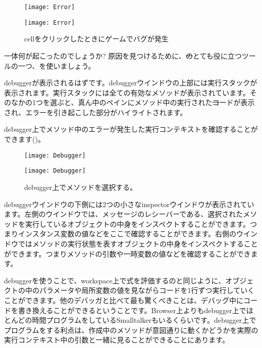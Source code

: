 \documentclass[a4paper,10pt,twoside]{book}
\begin{document}
\begin{figure}[ht]
\ifluluelse
	{\centerline{\texttt{[image: Error]}}}
	{\centerline{\texttt{[image: Error]}}}
\caption{cellをクリックしたときにゲームでバグが発生
}
\end{figure}

\noindent
一体何が起こったのでしょうか? 原因を見つけるために、\st のとても役に立つツールの一つ、を使いましょう。


debuggerが表示されるはずです。debuggerウインドウの上部には実行スタックが表示されます。実行スタックには全ての有効なメソッドが表示されています。そのなかの1つを選ぶと、真ん中のペインにメソッド中の実行された\st コードが表示され、エラーを引き起こした部分がハイライトされます。


debugger上でメソッド中のエラーが発生した実行コンテキストを確認することができます()。

\begin{figure}[ht]
\ifluluelse
	{\centerline {\texttt{[image: Debugger]}}}
	{\centerline {\texttt{[image: Debugger]}}}
\caption{debugger上でメソッドを選択する。
}
\end{figure}

debuggerウインドウの下側には2つの小さなinspectorウインドウが表示されています。左側のウインドウでは、メッセージのレシーバーである、選択されたメソッドを実行しているオブジェクトの中身をインスペクトすることができます。つまりインスタンス変数の値などをここで確認することができます。右側のウインドウではメソッドの実行状態を表すオブジェクトの中身をインスペクトすることができます。つまりメソッドの引数や一時変数の値などを確認することができます。

debuggerを使うことで、workspace上で式を評価するのと同じように、オブジェクトの中のパラメータや局所変数の値を見ながらコードを1行ずつ実行していくことができます。他のデバッガと比べて最も驚くべきことは、デバッグ中にコードを書き換えることができるということです。Browser上よりもdebugger上でほとんどの時間プログラムをしているSmalltalkerもいるくらいです。debugger上でプログラムをする利点は、作成中のメソッドが意図通りに動くかどうかを実際の実行コンテキスト中の引数と一緒に見ることができることにあります。
\end{document}
